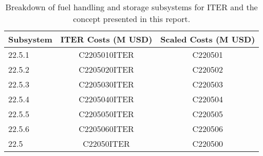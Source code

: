 \begin{table}
    \centering
    \begin{tabular}{lcc}
    \hline
        Subsystem & ITER Costs (M USD) & Scaled Costs (M USD)\\
        \hline
       22.5.1  & C2205010ITER & C220501\\
       22.5.2  & C2205020ITER & C220502\\
       22.5.3  & C2205030ITER & C220503\\
       22.5.4  & C2205040ITER & C220504\\
       22.5.5  & C2205050ITER & C220505\\
       22.5.6  & C2205060ITER & C220506\\
       22.5    & C22050ITER   & C220500\\
       \hline
    \end{tabular}
    \caption{Breakdown of fuel handling and storage subsystems for ITER and the concept presented in this report.}
    \label{tab:fuel}
\end{table}

